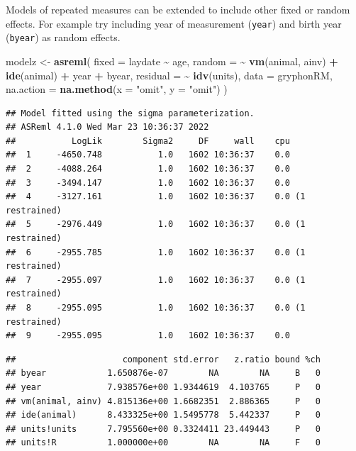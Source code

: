 \documentclass[
  12pt,
]{book}
\newenvironment{Shaded}{\begin{snugshade}}{\end{snugshade}}
\newcommand{\DataTypeTok}[1]{\textcolor[rgb]{0.13,0.29,0.53}{#1}}
\newcommand{\KeywordTok}[1]{\textcolor[rgb]{0.13,0.29,0.53}{\textbf{#1}}}
\newcommand{\NormalTok}[1]{#1}
\newcommand{\OperatorTok}[1]{\textcolor[rgb]{0.81,0.36,0.00}{\textbf{#1}}}
\newcommand{\StringTok}[1]{\textcolor[rgb]{0.31,0.60,0.02}{#1}}
\begin{document}
Models of repeated measures can be extended to include other fixed or random effects. For example try including year of measurement (\texttt{year}) and birth year (\texttt{byear}) as random effects.

\begin{Shaded}
\begin{Highlighting}[]
\NormalTok{modelz \textless{}{-}}\StringTok{ }\KeywordTok{asreml}\NormalTok{(}
  \DataTypeTok{fixed =}\NormalTok{ laydate }\OperatorTok{\textasciitilde{}}\StringTok{ }\NormalTok{age,}
  \DataTypeTok{random =} \OperatorTok{\textasciitilde{}}\StringTok{ }\KeywordTok{vm}\NormalTok{(animal, ainv) }\OperatorTok{+}\StringTok{ }\KeywordTok{ide}\NormalTok{(animal) }\OperatorTok{+}
\StringTok{    }\NormalTok{year }\OperatorTok{+}\StringTok{ }\NormalTok{byear,}
  \DataTypeTok{residual =} \OperatorTok{\textasciitilde{}}\StringTok{ }\KeywordTok{idv}\NormalTok{(units),}
  \DataTypeTok{data =}\NormalTok{ gryphonRM,}
  \DataTypeTok{na.action =} \KeywordTok{na.method}\NormalTok{(}\DataTypeTok{x =} \StringTok{"omit"}\NormalTok{, }\DataTypeTok{y =} \StringTok{"omit"}\NormalTok{)}
\NormalTok{)}
\end{Highlighting}
\end{Shaded}

\begin{verbatim}
## Model fitted using the sigma parameterization.
## ASReml 4.1.0 Wed Mar 23 10:36:37 2022
##           LogLik        Sigma2     DF     wall    cpu
##  1     -4650.748           1.0   1602 10:36:37    0.0
##  2     -4088.264           1.0   1602 10:36:37    0.0
##  3     -3494.147           1.0   1602 10:36:37    0.0
##  4     -3127.161           1.0   1602 10:36:37    0.0 (1 restrained)
##  5     -2976.449           1.0   1602 10:36:37    0.0 (1 restrained)
##  6     -2955.785           1.0   1602 10:36:37    0.0 (1 restrained)
##  7     -2955.097           1.0   1602 10:36:37    0.0 (1 restrained)
##  8     -2955.095           1.0   1602 10:36:37    0.0 (1 restrained)
##  9     -2955.095           1.0   1602 10:36:37    0.0
\end{verbatim}

\begin{Shaded}
\end{Shaded}

\begin{verbatim}
##                     component std.error   z.ratio bound %ch
## byear            1.650876e-07        NA        NA     B   0
## year             7.938576e+00 1.9344619  4.103765     P   0
## vm(animal, ainv) 4.815136e+00 1.6682351  2.886365     P   0
## ide(animal)      8.433325e+00 1.5495778  5.442337     P   0
## units!units      7.795560e+00 0.3324411 23.449443     P   0
## units!R          1.000000e+00        NA        NA     F   0
\end{verbatim}
\end{document}
